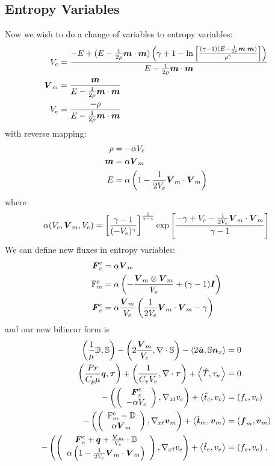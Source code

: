 \documentclass{article}
\begin{document}
\subsection*{Entropy Variables}
Now we wish to do a change of variables to entropy variables:
\begin{align*}
V_c&=\frac{-E+(E-\frac{1}{2\rho}\boldsymbol m\cdot\boldsymbol m)\left( \gamma+1-\ln\left[ \frac{(\gamma-1)(E-\frac{1}{2\rho}\boldsymbol m\cdot\boldsymbol m)}{\rho^\gamma} \right] \right)}
{E-\frac{1}{2\rho}\boldsymbol m\cdot\boldsymbol m}\\
\boldsymbol V_m&=\frac{\boldsymbol m}{E-\frac{1}{2\rho}\boldsymbol m\cdot\boldsymbol m}\\
V_e&=\frac{-\rho}{E-\frac{1}{2\rho}\boldsymbol m\cdot\boldsymbol m}\\
\end{align*}
with reverse mapping:
\begin{align*}
\rho&=-\alpha V_e\\
\boldsymbol m&=\alpha\boldsymbol V_m\\
E&=\alpha\left( 1-\frac{1}{2V_e}\boldsymbol V_m\cdot\boldsymbol V_m \right)\\
\end{align*}
where 
\[
\alpha(V_c,\boldsymbol V_m,V_e)=\left[ \frac{\gamma-1}{(-V_e)^\gamma} \right]^{\frac{1}{\gamma-1}}\exp\left[ \frac{-\gamma+V_c-\frac{1}{2V_e}\boldsymbol V_m\cdot\boldsymbol V_m}{\gamma-1} \right]
\]
We can define new fluxes in entropy variables:
\begin{align*}
\boldsymbol F^e_c&=\alpha\boldsymbol V_m\\
\mathbb{F}^e_m&=\alpha\left( -\frac{\boldsymbol V_m\otimes\boldsymbol V_m}{V_e}+(\gamma-1)\boldsymbol I \right)\\
\boldsymbol F^e_e&=\alpha\frac{\boldsymbol V_m}{V_e}\left( \frac{1}{2V_e}\boldsymbol V_m\cdot\boldsymbol V_m-\gamma \right)\\
\end{align*}
and our new bilinear form is
\begin{subequations}
\label{eq:entropyBF}
\begin{align}
	\left( \frac{1}{\mu}\mathbb{D},\mathbb{S} \right)-\left( 2\frac{\boldsymbol V_m}{V_e},\nabla\cdot\mathbb{S} \right)
	-\left\langle 2\hat{\boldsymbol u},\mathbb{S}\boldsymbol n_x \right\rangle&=0\\
	\left( \frac{Pr}{C_p\mu}\boldsymbol q,\boldsymbol\tau \right)+\left( \frac{1}{C_vV_e},\nabla\cdot\boldsymbol\tau \right)+\left\langle \hat T,\tau_n \right\rangle&=0\\
	-\left( \left( \begin{array}{c} \boldsymbol F^e_c\\ -\alpha V_e\\ \end{array} \right),\nabla_{xt} v_c \right)+\left\langle \hat t_c,v_c \right\rangle&=\left( f_c,v_c \right)\\
	-\left( \left( \begin{array}{c} \mathbb{F}^e_m-\mathbb{D}\\ \alpha\boldsymbol V_m\\ \end{array} \right),\nabla_{xt}\boldsymbol v_m \right)+\left\langle \hat{\boldsymbol t}_m,\boldsymbol v_m \right\rangle&=\left( \boldsymbol f_m,\boldsymbol v_m \right)\\
	-\left( \left( \begin{array}{c} \boldsymbol F^e_e+\boldsymbol q+\frac{\boldsymbol V_m}{V_e}\cdot\mathbb{D}\\ \alpha\left( 1-\frac{1}{2V_e}\boldsymbol V_m\cdot\boldsymbol V_m \right)\\ \end{array} \right),\nabla_{xt} v_e \right)
	+\left\langle \hat t_e,v_e \right\rangle&=\left( f_e,v_e \right)\,,
\end{align}
\end{subequations}
\end{document}
